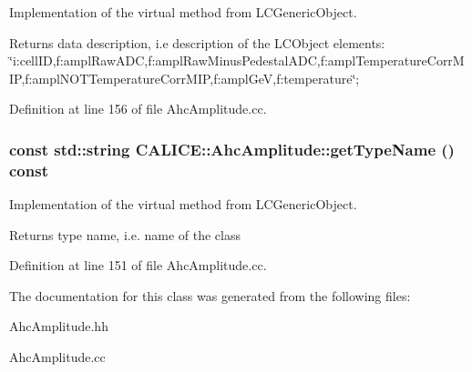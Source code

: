 Implementation of the virtual method from LCGenericObject. \begin{DoxyReturn}{Returns}
data description, i.e description of the LCObject elements: \char`\"{}i:cellID,f:amplRawADC,f:amplRawMinusPedestalADC,f:amplTemperatureCorrMIP,f:amplNOTTemperatureCorrMIP,f:amplGeV,f:temperature\char`\"{}; 
\end{DoxyReturn}


Definition at line 156 of file AhcAmplitude.cc.
\subsubsection[{getTypeName}]{\setlength{\rightskip}{0pt plus 5cm}const std::string CALICE::AhcAmplitude::getTypeName () const}\label{classCALICE_1_1AhcAmplitude_aa177cd1d27b9751a36e38775d8b439c7}


Implementation of the virtual method from LCGenericObject. \begin{DoxyReturn}{Returns}
type name, i.e. name of the class 
\end{DoxyReturn}


Definition at line 151 of file AhcAmplitude.cc.

The documentation for this class was generated from the following files:\begin{DoxyCompactItemize}
\item 
AhcAmplitude.hh\item 
AhcAmplitude.cc\end{DoxyCompactItemize}
